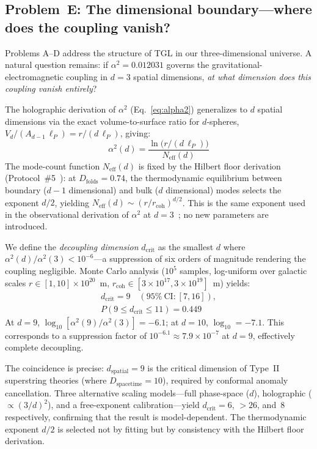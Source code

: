 \documentclass[12pt,a4paper,twocolumn]{article}
\newcommand{\alphaii}{\alpha^{2}}
\newcommand{\Dfolds}{D_{\text{folds}}}
\begin{document}
\subsection{Problem~E: The dimensional boundary---where does the coupling vanish?}
\label{sec:dimensional}

Problems A--D address the structure of TGL in our three-dimensional universe. A natural question remains: if $\alphaii = 0.012031$ governs the gravitational-electromagnetic coupling in $d = 3$ spatial dimensions, \emph{at what dimension does this coupling vanish entirely}?

The holographic derivation of $\alphaii$ (Eq.~\ref{eq:alpha2}) generalizes to $d$ spatial dimensions via the exact volume-to-surface ratio for $d$-spheres, $V_d / (A_{d-1}\,\ell_P) = r / (d\,\ell_P)$, giving:
\begin{equation}
\alpha^2(d) = \frac{\ln\!\bigl(r / (d\,\ell_P)\bigr)}{N_{\text{eff}}(d)}
\label{eq:alpha2_d}
\end{equation}
The mode-count function $N_{\text{eff}}(d)$ is fixed by the Hilbert floor derivation (Protocol~\#5~\cite{Miguel2026Fronteira}): at $\Dfolds = 0.74$, the thermodynamic equilibrium between boundary ($d{-}1$ dimensional) and bulk ($d$ dimensional) modes selects the exponent $d/2$, yielding $N_{\text{eff}}(d) \sim (r / r_{\text{coh}})^{d/2}$. This is the same exponent used in the observational derivation of $\alphaii$ at $d = 3$~\cite{Miguel2026Acoplamento}; no new parameters are introduced.

We define the \emph{decoupling dimension} $d_{\text{crit}}$ as the smallest $d$ where $\alpha^2(d) / \alpha^2(3) < 10^{-6}$---a suppression of six orders of magnitude rendering the coupling negligible. Monte Carlo analysis ($10^5$ samples, log-uniform over galactic scales $r \in [1, 10] \times 10^{20}$~m, $r_{\text{coh}} \in [3 \times 10^{17}, 3 \times 10^{19}]$~m) yields:
\begin{multline}
d_{\text{crit}} = 9 \quad (95\%\ \text{CI:}\ [7, 16]), \\
P(9 \leq d_{\text{crit}} \leq 11) = 0.449
\label{eq:dcrit}
\end{multline}
At $d = 9$, $\log_{10}[\alpha^2(9)/\alpha^2(3)] = -6.1$; at $d = 10$, $\log_{10} = -7.1$. This corresponds to a suppression factor of $10^{-6.1} \approx 7.9 \times 10^{-7}$ at $d = 9$, effectively complete decoupling.

The coincidence is precise: $d_{\text{spatial}} = 9$ is the critical dimension of Type~II superstring theories (where $D_{\text{spacetime}} = 10$), required by conformal anomaly cancellation. Three alternative scaling models---full phase-space ($d$), holographic ($\propto (3/d)^2$), and a free-exponent calibration---yield $d_{\text{crit}} = 6$, $> 26$, and~$8$ respectively, confirming that the result is model-dependent. The thermodynamic exponent $d/2$ is selected not by fitting but by consistency with the Hilbert floor derivation.
\end{document}
